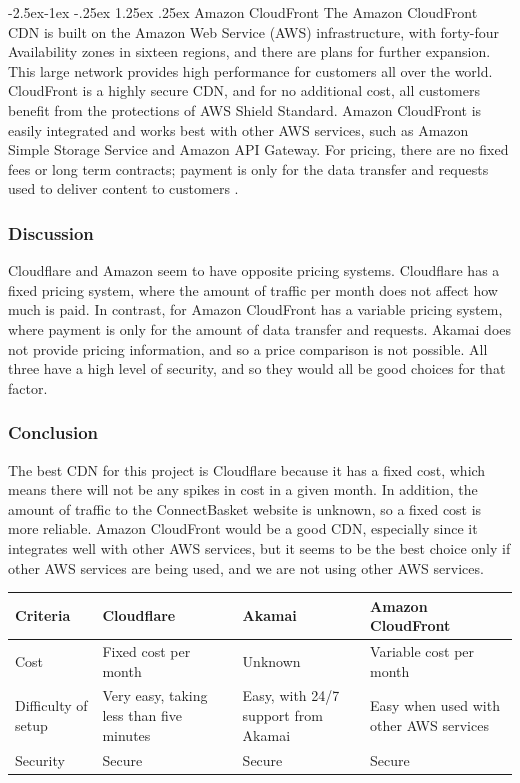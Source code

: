 \documentclass[onecolumn, draftclsnofoot,10pt, compsoc]{IEEEtran}
\makeatletter
\renewcommand\paragraph{\@startsection{paragraph}{4}{\z@}%
            {-2.5ex\@plus -1ex \@minus -.25ex}%
            {1.25ex \@plus .25ex}%
            {\normalfont\normalsize\bfseries}}
\makeatother
\begin{document}
\paragraph{Amazon CloudFront}
The Amazon CloudFront CDN is built on the Amazon Web Service (AWS) infrastructure, with forty-four Availability zones in sixteen regions, and there are plans for further expansion. This large network provides high performance for customers all over the world. CloudFront is a highly secure CDN, and for no additional cost, all customers benefit from the protections of AWS Shield Standard. Amazon CloudFront is easily integrated and works best with other AWS services, such as Amazon Simple Storage Service and Amazon API Gateway. For pricing, there are no fixed fees or long term contracts; payment is only for the data transfer and requests used to deliver content to customers \cite{amazoncloudfront}.


\subsubsection{Discussion}
Cloudflare and Amazon seem to have opposite pricing systems. Cloudflare has a fixed pricing system, where the amount of traffic per month does not affect how much is paid. In contrast, for Amazon CloudFront has a variable pricing system, where payment is only for the amount of data transfer and requests. Akamai does not provide pricing information, and so a price comparison is not possible. All three have a high level of security, and so they would all be good choices for that factor.

\subsubsection{Conclusion}
The best CDN for this project is Cloudflare because it has a fixed cost, which means there will not be any spikes in cost in a given month. In addition, the amount of traffic to the ConnectBasket website is unknown, so a fixed cost is more reliable. Amazon CloudFront would be a good CDN, especially since it integrates well with other AWS services, but it seems to be the best choice only if other AWS services are being used, and we are not using other AWS services.

\begin{table}[h!]
\centering
\begin{tabular}{ |p{.2\linewidth}|p{.2\linewidth}|p{.2\linewidth}|p{.2\linewidth}| } 
\hline
\textbf{Criteria} & \textbf{Cloudflare} & \textbf{Akamai} & \textbf{Amazon CloudFront} \\ \hline
Cost & Fixed cost per month & Unknown & Variable cost per month \\ \hline
Difficulty of setup & Very easy, taking less than five minutes & Easy, with 24/7 support from Akamai & Easy when used with other AWS services\\ \hline
Security & Secure & Secure & Secure \\ \hline
\end{tabular}
\end{table}
\end{document}
